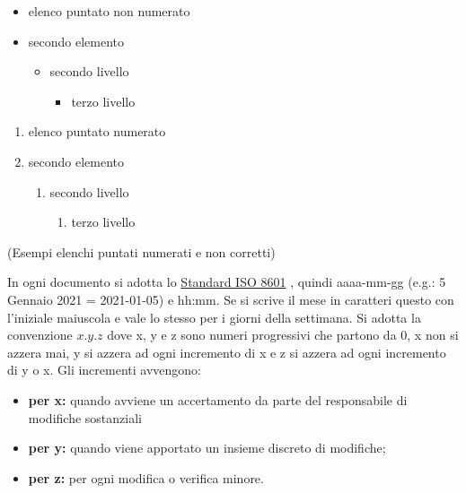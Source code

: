                 \begin{multicols}{2}
                    \begin{itemize}
                        \item elenco puntato non numerato
                        \item secondo elemento
                        \begin{itemize}
                            \item secondo livello
                            \begin{itemize}
                                \item terzo livello
                            \end{itemize}
                        \end{itemize}
                    \end{itemize}
                    \begin{enumerate}
                        \item elenco puntato numerato
                        \item secondo elemento
                        \begin{enumerate}
                            \item secondo livello
                            \begin{enumerate}
                                \item terzo livello
                            \end{enumerate}
                        \end{enumerate}
                    \end{enumerate}
                \end{multicols}
                \centerline{(Esempi elenchi puntati numerati e non corretti)}
                In ogni documento si adotta lo \href{https://www.iso.org/iso-8601-date-and-time-format.html}{Standard ISO 8601} , quindi aaaa-mm-gg (e.g.: 5 Gennaio 2021 = 2021-01-05) e hh:mm. Se si scrive il mese in caratteri questo con l'iniziale maiuscola e vale lo stesso per i giorni della settimana.
            \label{versions}
                Si adotta la convenzione $x.y.z$ dove x, y e z sono numeri progressivi che partono da 0, x non si azzera mai, y si azzera ad ogni incremento di x e z si azzera ad ogni incremento di y o x. Gli incrementi avvengono:
                \begin{itemize}
                    \item \textbf{per x: }quando avviene un accertamento da parte del responsabile di modifiche sostanziali
                    \item \textbf{per y: }quando viene apportato un insieme discreto di modifiche;
                    \item \textbf{per z: }per ogni modifica o verifica minore.
                \end{itemize}

